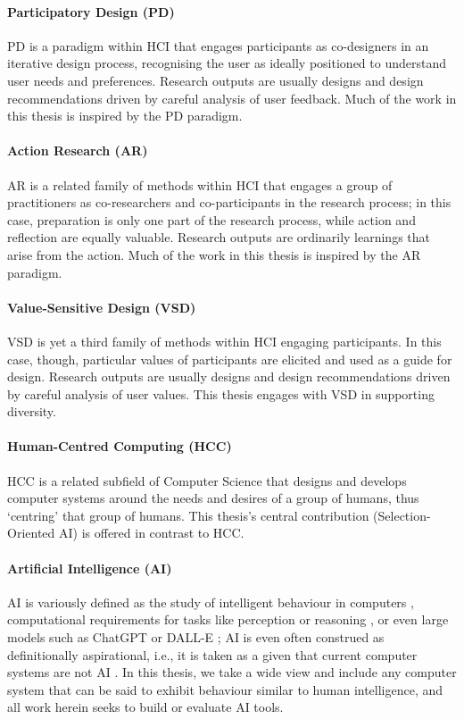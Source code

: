 \paragraph{Participatory Design (PD)}
PD is a paradigm within HCI that engages participants as co-designers in an iterative design process, recognising the user as ideally positioned to understand user needs and preferences. Research outputs are usually designs and design recommendations driven by careful analysis of user feedback. Much of the work in this thesis is inspired by the PD paradigm.

\paragraph{Action Research (AR)}
AR is a related family of methods within HCI that engages a group of practitioners as co-researchers and co-participants in the research process; in this case, preparation is only one part of the research process, while action and reflection are equally valuable. Research outputs are ordinarily learnings that arise from the action.  Much of the work in this thesis is inspired by the AR paradigm.

\paragraph{Value-Sensitive Design (VSD)}
VSD is yet a third family of methods within HCI engaging participants. In this case, though, particular values of participants are elicited and used as a guide for design. Research outputs are usually designs and design recommendations driven by careful analysis of user values. This thesis engages with VSD in supporting diversity.

\paragraph{Human-Centred Computing (HCC)}
HCC is a related subfield of Computer Science that designs and develops computer systems around the needs and desires of a group of humans, thus `centring' that group of humans. This thesis's central contribution (Selection-Oriented AI) is offered in contrast to HCC.

\paragraph{Artificial Intelligence (AI)}
AI is variously defined as the study of intelligent behaviour in computers \cite{wang2008you}, computational requirements for tasks like perception or reasoning \cite{Leake2001ArtiicialI}, or even large models such as ChatGPT or DALL-E \cite{du2020ai}; AI is even often construed as definitionally aspirational, i.e., it is taken as a given that current computer systems are not AI \cite{wang2008you}. In this thesis, we take a wide view and include any computer system that can be said to exhibit behaviour similar to human intelligence, and all work herein seeks to build or evaluate AI tools.

